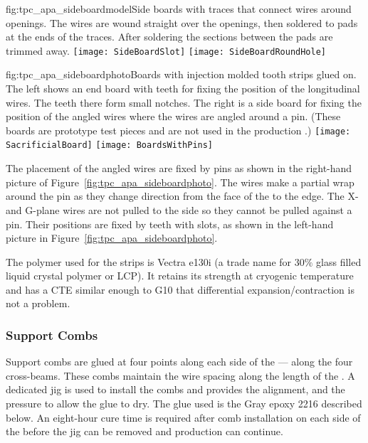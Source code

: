 \begin{dunefigure}{fig:tpc_apa_sideboardmodel}{Side boards with traces that connect wires around openings.  The wires are wound straight over the openings, then soldered to pads at the ends of the traces.  After soldering the sections between the pads are trimmed away.}
\texttt{[image: SideBoardSlot]} 
\texttt{[image: SideBoardRoundHole]} 
\end{dunefigure}


\begin{dunefigure}{fig:tpc_apa_sideboardphoto}{Boards with injection molded tooth strips glued on.  The left shows an end board with teeth for fixing the position of the longitudinal wires.  The teeth there form small notches. The right is a side board for fixing the position of the angled wires where the wires are angled around a pin. (These boards are prototype test pieces and are not used in the production .)}
\texttt{[image: SacrificialBoard]} 
\texttt{[image: BoardsWithPins]} 
\end{dunefigure}

The placement of the angled wires are fixed by pins 
as shown in the right-hand picture of Figure~\ref{fig:tpc_apa_sideboardphoto}.  The wires make a partial wrap around the pin as they change direction from the face of the   to the edge.  The X- and G-plane wires are not pulled to the side so they cannot be pulled against a pin.  Their positions are fixed 
by teeth with slots, as shown in the left-hand picture in Figure~\ref{fig:tpc_apa_sideboardphoto}. 
	
The polymer used for the strips is Vectra e130i (a trade name for 30$\%$ glass filled liquid crystal polymer or LCP). It retains its strength at cryogenic temperature and has a CTE similar enough to G10 that differential expansion/contraction is not a problem.


\subsubsection{Support Combs}

Support combs are glued at four points along each side of the  --- along the four cross-beams. These combs maintain the wire spacing along the length of the . A dedicated jig is used to install the combs and provides the alignment, and the pressure to allow the glue to dry. The glue used is the Gray epoxy 2216 described below. An eight-hour cure time is required after comb installation on each side of the  before the jig can be removed and production can continue.

